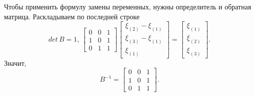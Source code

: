 \begin{enumerate}[label=\alph*)]
  Чтобы применить формулу замены переменных, нужны определитель и обратная матрица.
  Раскладываем по последней строке
  $$det \, B = 1, \,
    \begin{bmatrix}
      0 & 0 & 1 \\
      1 & 0 & 1 \\
      0 & 1 & 1
    \end{bmatrix}
    \begin{bmatrix}
      \xi_{ \left( 2 \right) } - \xi_{ \left( 1 \right) } \\
      \xi_{ \left( 3 \right) } - \xi_{ \left( 1 \right) } \\
      \xi_{ \left( 1 \right) }
    \end{bmatrix} =
    \begin{bmatrix}
      \xi_{ \left( 1 \right) } \\
      \xi_{ \left( 2 \right) } \\
      \xi_{ \left( 3 \right) }
    \end{bmatrix}.$$
  Значит,
  $$B^{-1} =
    \begin{bmatrix}
      0 & 0 & 1 \\
      1 & 0 & 1 \\
      0 & 1 & 1
    \end{bmatrix}.$$


\end{enumerate}
